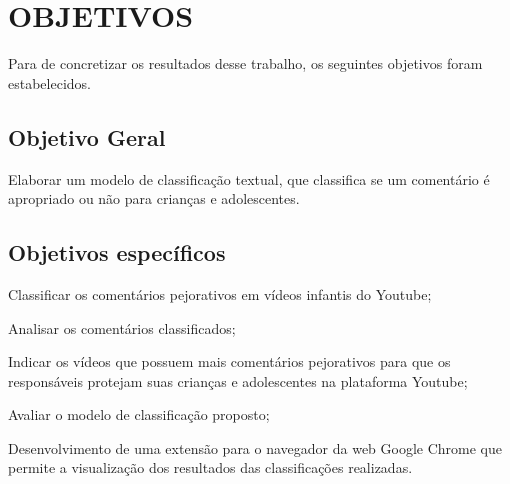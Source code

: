 
\newpage
\section{OBJETIVOS}

Para de concretizar os resultados desse trabalho, os seguintes objetivos foram estabelecidos.

\subsection{Objetivo Geral}

Elaborar um modelo de classificação textual, que classifica se um comentário é apropriado ou não para crianças e adolescentes.

\begin{comment}
Example inline comment
\end{comment}

\subsection{Objetivos específicos}

\begin{alineas}
    
    \item Classificar os comentários pejorativos em vídeos infantis do Youtube;
    \item Analisar os comentários classificados;
    \item Indicar os vídeos que possuem mais comentários pejorativos para que os responsáveis protejam suas crianças e adolescentes na plataforma Youtube; 
    \item Avaliar o modelo de classificação proposto;
    \item Desenvolvimento de uma extensão para o navegador da web Google Chrome que permite a visualização dos resultados das classificações realizadas.
    
\end{alineas}
